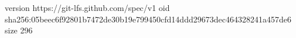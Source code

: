 version https://git-lfs.github.com/spec/v1
oid sha256:05beec6f92801b7472de30b19e799450cfd14ddd29673dec464328241a457de6
size 296

